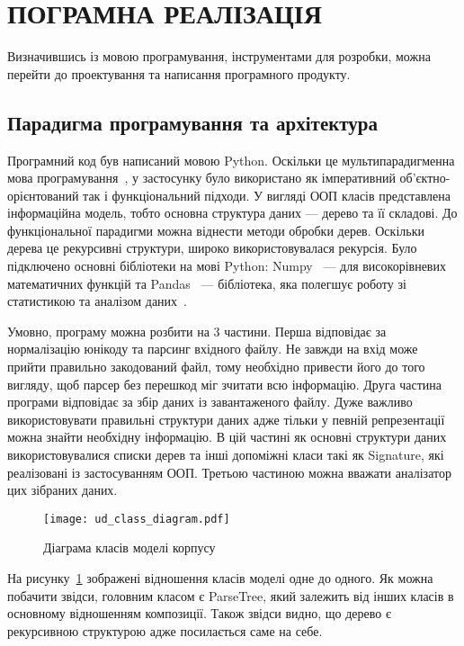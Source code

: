 \section{ПОГРАМНА РЕАЛІЗАЦІЯ}
Визначившись із мовою програмування, інструментами для розробки, можна перейти
до проектування та написання програмного продукту.

\subsection{Парадигма програмування та архітектура}
Програмний код був написаний мовою Python. Оскільки це мультипарадигменна мова
програмування~\cite{bib16},
у застосунку було використано як імперативний об'єктно-орієнтований так і функціональний підходи.
У вигляді ООП класів представлена інформаційна модель, тобто основна структура
даних --- дерево та її складові. До функціональної парадигми можна віднести методи обробки
дерев. Оскільки дерева це рекурсивні структури, широко використовувалася рекурсія.
Було підключено основні бібліотеки на мові Python: Numpy~\cite{bib21} --- для високорівневих
математичних функцій та Pandas~\cite{bib20} --- бібліотека, яка полегшує
роботу зі статистикою та аналізом даних~\cite{bib15}.

Умовно, програму можна розбити на 3 частини. Перша відповідає за нормалізацію
юнікоду та парсинг вхідного файлу. Не завжди на вхід може прийти правильно
закодований файл, тому необхідно привести його до того вигляду, щоб парсер без
перешкод міг зчитати всю інформацію. Друга частина
програми відповідає за збір даних із завантаженого файлу. Дуже важливо використовувати
правильні структури даних адже тільки у певній репрезентації можна знайти необхідну
інформацію. В цій частині як основні структури даних використовувалися
списки дерев та інші допоміжні класи такі як Signature, які реалізовані із застосуванням ООП.
Третьою частиною можна вважати аналізатор цих зібраних даних.

\begin{figure}[p]
  \begin{center}
    \texttt{[image: ud\_class\_diagram.pdf]}
  \end{center}
  \caption{Діаграма класів моделі корпусу}
  \label{img:class_diagram}
\end{figure}
\newpage

На рисунку~\ref{img:class_diagram} зображені відношення класів моделі одне до одного.
Як можна побачити звідси, головним класом є ParseTree, який залежить від інших класів
в основному відношенням композиції. Також звідси видно, що дерево є рекурсивною
структурою адже посилається саме на себе.

